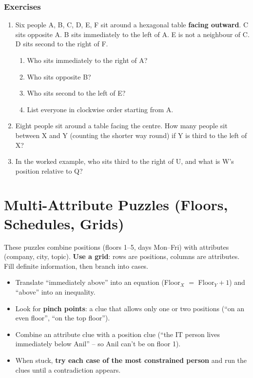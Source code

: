 \documentclass[11pt,a4paper,openany]{report}
\newenvironment{exercises}{\subsection*{Exercises \thechapter}\begin{enumerate}[label=\textbf{\thechapter.\arabic*},leftmargin=3.2em]}{\end{enumerate}}
\begin{document}
\begin{exercises}
\item Six people A, B, C, D, E, F sit around a hexagonal table \textbf{facing outward}.
C sits opposite A. B sits immediately to the left of A. E is not a neighbour of C. D sits second to the right of F.
\begin{enumerate}[nosep,label=(\alph*)]
\item Who sits immediately to the right of A?
\item Who sits opposite B?
\item Who sits second to the left of E?
\item List everyone in clockwise order starting from A.
\end{enumerate}
\item Eight people sit around a table facing the centre. How many people sit between X and Y (counting the shorter way round) if Y is third to the left of X?
\item In the worked example, who sits third to the right of U, and what is W's position relative to Q?
\end{exercises}

\chapter{Multi-Attribute Puzzles (Floors, Schedules, Grids)}\label{ch:multi}

These puzzles combine positions (floors 1--5, days Mon--Fri) with attributes (company, city, topic).
\textbf{Use a grid}: rows are positions, columns are attributes. Fill definite information, then branch into cases.

\begin{idea}
\begin{itemize}[nosep]
\item Translate ``immediately above'' into an equation (Floor$_X$ $=$ Floor$_Y+1$) and ``above'' into an inequality.
\item Look for \textbf{pinch points}: a clue that allows only one or two positions (``on an even floor'', ``on the top floor'').
\item Combine an attribute clue with a position clue (``the IT person lives immediately below Anil'' -- so Anil can't be on floor 1).
\item When stuck, \textbf{try each case of the most constrained person} and run the clues until a contradiction appears.
\end{itemize}
\end{idea}
\end{document}
